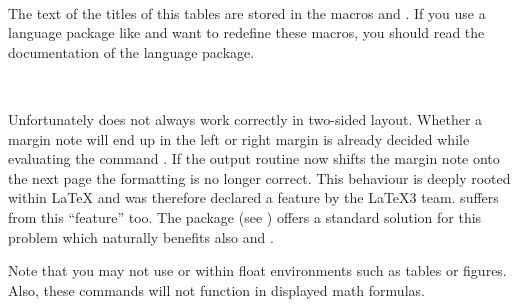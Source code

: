 \begin{Declaration}
  \\
\end{Declaration}
%
%
The text of the titles of this tables are stored in the macros
 and . If you use a
language package like  and want to redefine these
macros, you should read the documentation of the language package.
%
%
%

\begin{Declaration}
  \\
\end{Declaration}%
%
%
Unfortunately  does not always work correctly in
two-sided layout. Whether a margin note will end up in the left
or right margin is already decided while evaluating the command
. If the output routine now shifts the margin note onto the
next page the formatting is no longer correct. This behaviour is deeply rooted
within {\LaTeX} and was therefore declared a feature by the {\LaTeX}3
team.  suffers from this ``feature'' too. The package
 (see \cite{package:mparhack}) offers
a standard solution for this problem which naturally benefits also
 and .

Note that you may not use  or  within float
environments such as tables or figures. Also, these commands will not function
in displayed math formulas.%
%
%
%

\endinput

